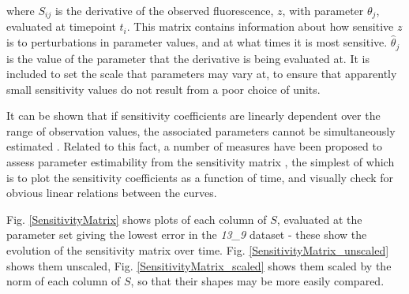 \documentclass[10pt,journal]{./IEEE_latex_class/IEEEtran}
\begin{document}
where $S_{ij}$ is the derivative of the observed fluorescence, $z$, with parameter $\theta_{j}$, evaluated at timepoint $t_{i}$. This matrix contains information about how sensitive $z$ is to perturbations in parameter values, and at what times it is most sensitive. $\hat{\theta}_{j}$ is the value of the parameter that the derivative is being evaluated at. It is included to set the scale that parameters may vary at, to ensure that apparently small sensitivity values do not result from a poor choice of units.

It can be shown that if sensitivity coefficients are linearly dependent over the range of observation values, the associated parameters cannot be simultaneously estimated \cite{Beck}. Related to this fact, a number of measures have been proposed to assess parameter estimability from the sensitivity matrix \cite{Mclean2012}, the simplest of which is to plot the sensitivity coefficients as a function of time, and visually check for obvious linear relations between the curves.

Fig. \ref{SensitivityMatrix} shows plots of each column of $S$, evaluated at the parameter set giving the lowest error in the \textit{13\_9} dataset - these show the evolution of the sensitivity matrix over time. Fig. \ref{SensitivityMatrix_unscaled} shows them unscaled, Fig. \ref{SensitivityMatrix_scaled} shows them scaled by the norm of each column of $S$, so that their shapes may be more easily compared.
\end{document}
